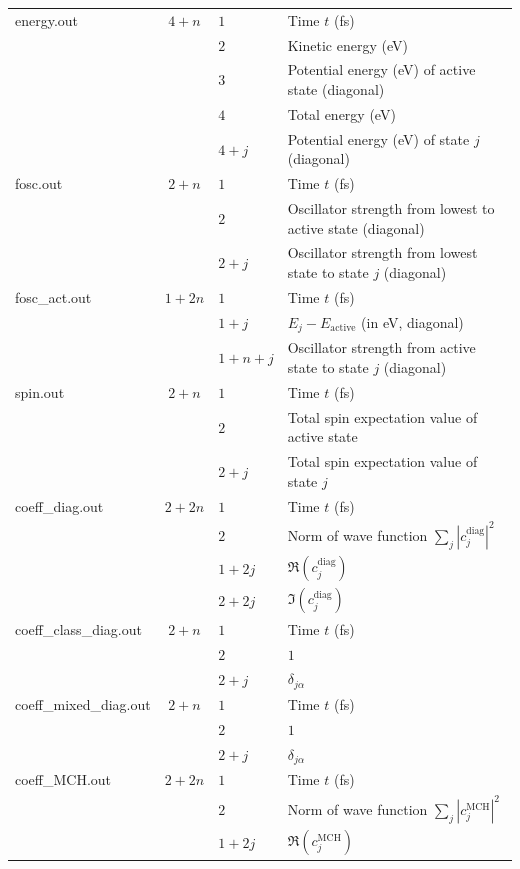 \documentclass[a4paper,10pt,DIV=15,openany]{scrbook}
\begin{document}
{\begin{longtable}{>{\ttfamily}lcll}
    energy.out       &$4+n$
      &$1$ &Time $t$ (fs)\\
      &&$2$ &Kinetic energy (eV)\\
      &&$3$ &Potential energy (eV) of active state (diagonal)\\
      &&$4$ &Total energy (eV)\\
      &&$4+j$ &Potential energy (eV) of state $j$ (diagonal)\\
    \hline
    fosc.out       &$2+n$
      &$1$ &Time $t$ (fs)\\
      &&$2$ &Oscillator strength from lowest to active state (diagonal)\\
      &&$2+j$ &Oscillator strength from lowest state to state $j$ (diagonal)\\
    \hline
    fosc\_act.out       &$1+2n$
      &$1$ &Time $t$ (fs)\\
      &&$1+j$ &$E_j-E_\text{active}$ (in eV, diagonal)\\
      &&$1+n+j$ &Oscillator strength from active state to state $j$ (diagonal)\\
    \hline
    spin.out       &$2+n$
      &$1$ &Time $t$ (fs)\\
      &&$2$ &Total spin expectation value of active state\\
      &&$2+j$ &Total spin expectation value of state $j$\\
    \hline
    coeff\_diag.out       &$2+2n$
      &$1$ &Time $t$ (fs)\\
      &&$2$ &Norm of wave function $\sum_j |c_j^{\text{diag}}|^2$\\
      &&$1+2j$ &$\Re (c_j^{\text{diag}})$\\
      &&$2+2j$ &$\Im (c_j^{\text{diag}})$\\
    \hline
    coeff\_class\_diag.out       &$2+n$
      &$1$ &Time $t$ (fs)\\
      &&$2$ &$1$\\
      &&$2+j$ &$\delta_{j\alpha}$\\
    \hline
    coeff\_mixed\_diag.out       &$2+n$
      &$1$ &Time $t$ (fs)\\
      &&$2$ &$1$\\
      &&$2+j$ &$\delta_{j\alpha}$\\
    \hline
    coeff\_MCH.out       &$2+2n$
      &$1$ &Time $t$ (fs)\\
      &&$2$ &Norm of wave function $\sum_j |c_j^{\text{MCH}}|^2$\\
      &&$1+2j$ &$\Re (c_j^{\text{MCH}})$\\

\end{longtable}}
\end{document}

